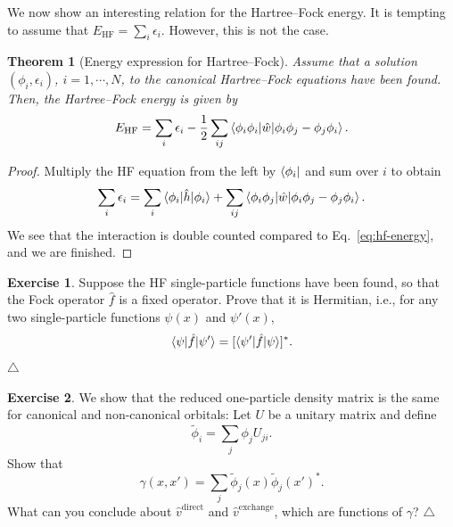\documentclass{report}
\theoremstyle{plain}
\newtheorem{theorem}{Theorem}[chapter]
\theoremstyle{definition}
\newtheorem{exerc}{Exercise}[chapter]
\newcommand\xqed[1]{%
  \leavevmode\unskip\penalty9999 \hbox{}\nobreak\hfill
  \quad\hbox{#1}}
\newcommand\demo{\xqed{$\triangle$}}
\newenvironment{exercise}{\bigskip\begin{exerc}}{\demo\end{exerc}\bigskip}
\begin{document}
We now show an interesting relation for the Hartree--Fock energy. It
is tempting to assume that $E_\text{HF} = \sum_i \epsilon_i$. However,
this is not the case.
\begin{theorem}[Energy expression for Hartree--Fock]
  Assume that a solution $(\phi_i,\epsilon_i)$, $i=1,\cdots,N$, to the
  canonical Hartree--Fock equations have been found. Then, the Hartree--Fock
  energy is given by
\begin{equation}
  E_\text{HF} = \sum_i \epsilon_i -
  \frac{1}{2}\sum_{ij}\braket{\phi_i\phi_i|\hat{w}|\phi_i\phi_j-\phi_j\phi_i}.
\end{equation}
\end{theorem}
\begin{proof}
  Multiply the HF equation from the left by $\bra{\phi_i}$ and sum
  over $i$ to obtain
  \begin{equation}
    \sum_i \epsilon_i = \sum_i \braket{\phi_i|\hat{h}|\phi_i} + \sum_{ij}
    \braket{\phi_i\phi_j|\hat{w}|\phi_i \phi_j - \phi_j \phi_i}.
  \end{equation}
  We see that the interaction is double counted compared to
  Eq.~\eqref{eq:hf-energy}, and we are finished.
\end{proof}


\begin{exercise}\label{exercise:fock-hermitian}
  Suppose the HF single-particle functions have been found, so that
  the Fock operator $\hat{f}$ is a fixed operator. Prove that it is
  Hermitian, i.e., for any two single-particle functions $\psi(x)$ and
  $\psi'(x)$,
  \[ \braket{\psi|\hat{f}|\psi'} = [\braket{\psi'|\hat{f}|\psi}]^*.\]
\end{exercise}

\begin{exercise}\label{exercise:gamma-inv}
  We show that the reduced one-particle density matrix is the same for
  canonical and non-canonical orbitals: Let $U$ be a unitary matrix
  and define
  \begin{equation}
    \tilde{\phi}_i = \sum_j \phi_j U_{ji}.
  \end{equation}
  Show that
  \begin{equation}
    \gamma(x,x') = \sum_j \tilde{\phi}_j(x)\tilde{\phi}_{j}(x')^*.
  \end{equation}
  What can you conclude about $\hat{v}^\text{direct}$ and
  $\hat{v}^\text{exchange}$, which are functions of $\gamma$? 
\end{exercise}
\end{document}
